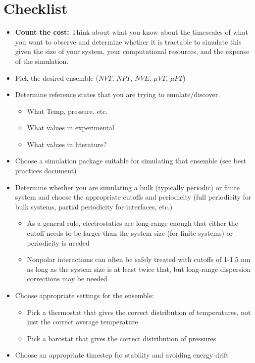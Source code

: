 \documentclass[9pt,bestpractices]{livecoms}
\begin{document}
\section{Checklist}
\begin{itemize}
\item \textbf{Count the cost:} Think about what you know about the timescales of what you want to observe and determine whether it is tractable to simulate this given the size of your system, your computational resources, and the expense of the simulation.
\item Pick the desired ensemble ($NVT$, $NPT$, $NVE$, $\mu VT$, $\mu PT$)
\item Determine reference states that you are trying to emulate/discover.
\begin{itemize}
\item What Temp, pressure, etc.
\item What values in experimental
\item What values in literature?
\end{itemize}
\item Choose a simulation package suitable for simulating that ensemble (see best practices document) 
\item Determine whether you are simulating a bulk (typically periodic) or finite system and choose the appropriate cutoffs and periodicity (full periodicity for bulk systems, partial periodicity for interfaces, etc.)
\begin{itemize}
\item As a general rule, electrostatics are long-range enough that either the cutoff needs to be larger than the system size (for finite systems) or periodicity is needed
\item Nonpolar interactions can often be safely treated with cutoffs of 1-1.5 nm as long as the system size is at least twice that, but long-range dispersion corrections may be needed
\end{itemize}
\item Choose appropriate settings for the ensemble:
\begin{itemize}
\item Pick a thermostat that gives the correct distribution of temperatures, not just the correct average temperature
\item Pick a barostat that gives the correct distribution of pressures
\end{itemize}
\item Choose an appropriate timestep for stability and avoiding energy drift

\end{itemize}
\end{document}
